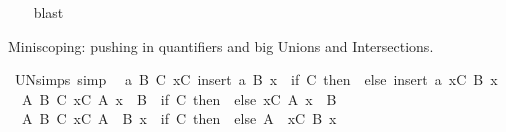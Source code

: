 \begin{isabellebody}
%
\isadelimproof
\ \ %
\endisadelimproof
%
\isatagproof
{}\isamarkupfalse%
\ blast%
\endisatagproof
{\isafoldproof}%
%
\isadelimproof
%
\endisadelimproof
%
\isadelimdocument
%
\endisadelimdocument
%
\isatagdocument
%
\isamarkuptrue%
%
\endisatagdocument
{\isafolddocument}%
%
\isadelimdocument
%
\endisadelimdocument
%
\begin{isamarkuptext}%
\medskip Miniscoping: pushing in quantifiers and big Unions and Intersections.%
\end{isamarkuptext}\isamarkuptrue%
\isamarkupfalse%
\ UN{\isacharunderscore}{\kern0pt}simps\ {\isacharbrackleft}{\kern0pt}simp{\isacharbrackright}{\kern0pt}{\isacharcolon}{\kern0pt}\isanewline
\ \ {\isachardoublequoteopen}{\isasymAnd}a\ B\ C{\isachardot}{\kern0pt}\ {\isacharparenleft}{\kern0pt}{\isasymUnion}x{\isasymin}C{\isachardot}{\kern0pt}\ insert\ a\ {\isacharparenleft}{\kern0pt}B\ x{\isacharparenright}{\kern0pt}{\isacharparenright}{\kern0pt}\ {\isacharequal}{\kern0pt}\ {\isacharparenleft}{\kern0pt}if\ C{\isacharequal}{\kern0pt}{\isacharbraceleft}{\kern0pt}{\isacharbraceright}{\kern0pt}\ then\ {\isacharbraceleft}{\kern0pt}{\isacharbraceright}{\kern0pt}\ else\ insert\ a\ {\isacharparenleft}{\kern0pt}{\isasymUnion}x{\isasymin}C{\isachardot}{\kern0pt}\ B\ x{\isacharparenright}{\kern0pt}{\isacharparenright}{\kern0pt}{\isachardoublequoteclose}\isanewline
\ \ {\isachardoublequoteopen}{\isasymAnd}A\ B\ C{\isachardot}{\kern0pt}\ {\isacharparenleft}{\kern0pt}{\isasymUnion}x{\isasymin}C{\isachardot}{\kern0pt}\ A\ x\ {\isasymunion}\ B{\isacharparenright}{\kern0pt}\ {\isacharequal}{\kern0pt}\ {\isacharparenleft}{\kern0pt}{\isacharparenleft}{\kern0pt}if\ C{\isacharequal}{\kern0pt}{\isacharbraceleft}{\kern0pt}{\isacharbraceright}{\kern0pt}\ then\ {\isacharbraceleft}{\kern0pt}{\isacharbraceright}{\kern0pt}\ else\ {\isacharparenleft}{\kern0pt}{\isasymUnion}x{\isasymin}C{\isachardot}{\kern0pt}\ A\ x{\isacharparenright}{\kern0pt}\ {\isasymunion}\ B{\isacharparenright}{\kern0pt}{\isacharparenright}{\kern0pt}{\isachardoublequoteclose}\isanewline
\ \ {\isachardoublequoteopen}{\isasymAnd}A\ B\ C{\isachardot}{\kern0pt}\ {\isacharparenleft}{\kern0pt}{\isasymUnion}x{\isasymin}C{\isachardot}{\kern0pt}\ A\ {\isasymunion}\ B\ x{\isacharparenright}{\kern0pt}\ {\isacharequal}{\kern0pt}\ {\isacharparenleft}{\kern0pt}{\isacharparenleft}{\kern0pt}if\ C{\isacharequal}{\kern0pt}{\isacharbraceleft}{\kern0pt}{\isacharbraceright}{\kern0pt}\ then\ {\isacharbraceleft}{\kern0pt}{\isacharbraceright}{\kern0pt}\ else\ A\ {\isasymunion}\ {\isacharparenleft}{\kern0pt}{\isasymUnion}x{\isasymin}C{\isachardot}{\kern0pt}\ B\ x{\isacharparenright}{\kern0pt}{\isacharparenright}{\kern0pt}{\isacharparenright}{\kern0pt}{\isachardoublequoteclose}\isanewline

\end{isabellebody}
